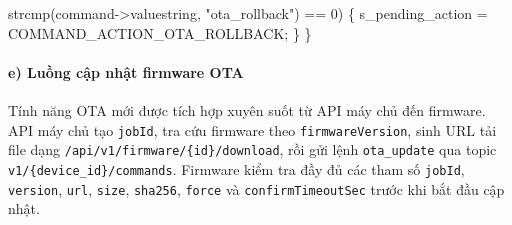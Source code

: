 \documentclass[a4paper]{extarticle}
\newenvironment{Shaded}{}{}
\newcommand{\DecValTok}[1]{\textcolor[rgb]{0.25,0.63,0.44}{#1}}
\newcommand{\NormalTok}[1]{#1}
\newcommand{\OperatorTok}[1]{\textcolor[rgb]{0.40,0.40,0.40}{#1}}
\newcommand{\StringTok}[1]{\textcolor[rgb]{0.25,0.44,0.63}{#1}}
\begin{document}
\begin{Shaded}
\begin{Highlighting}[]
\NormalTok{               strcmp}\OperatorTok{(}\NormalTok{command}\OperatorTok{{-}\textgreater{}}\NormalTok{valuestring}\OperatorTok{,} \StringTok{"ota\_rollback"}\OperatorTok{)} \OperatorTok{==} \DecValTok{0}\OperatorTok{)} \OperatorTok{\{}
\NormalTok{        s\_pending\_action }\OperatorTok{=}\NormalTok{ COMMAND\_ACTION\_OTA\_ROLLBACK}\OperatorTok{;}
    \OperatorTok{\}}
\OperatorTok{\}}
\end{Highlighting}
\end{Shaded}

\paragraph{e) Luồng cập nhật firmware
OTA}\label{e-luux1ed3ng-cux1eadp-nhux1eadt-firmware-ota}

Tính năng OTA mới được tích hợp xuyên suốt từ API máy chủ đến firmware.
API máy chủ tạo \texttt{jobId}, tra cứu firmware theo
\texttt{firmwareVersion}, sinh URL tải file dạng
\texttt{/api/v1/firmware/\{id\}/download}, rồi gửi lệnh
\texttt{ota\_update} qua topic \texttt{v1/\{device\_id\}/commands}.
Firmware kiểm tra đầy đủ các tham số \texttt{jobId}, \texttt{version},
\texttt{url}, \texttt{size}, \texttt{sha256}, \texttt{force} và
\texttt{confirmTimeoutSec} trước khi bắt đầu cập nhật.
\end{document}
